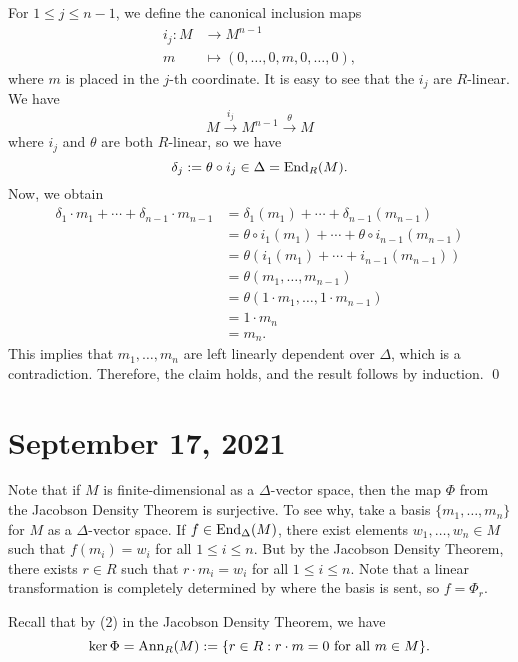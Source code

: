\begin{enumerate}[(1)]
    For $1 \leq j \leq n-1$, we define the canonical inclusion maps 
    \begin{align*}
        i_j : M &\to M^{n-1} \\
        m &\mapsto (0, \dots, 0, m, 0, \dots, 0),
    \end{align*}
    where $m$ is placed in the $j$-th coordinate. It is easy to see that the $i_j$ are $R$-linear. 
    We have 
    \[ M \xrightarrow{i_j} M^{n-1} \xrightarrow{\theta} M \]
    where $i_j$ and $\theta$ are both $R$-linear, so we have 
    \[ \delta_j := \theta \circ i_j \in \Delta = \operatorname{End}_R(M). \]
    Now, we obtain 
    \begin{align*}
        \delta_1 \cdot m_1 + \cdots + \delta_{n-1} \cdot m_{n-1} 
        &= \delta_1(m_1) + \cdots + \delta_{n-1}(m_{n-1}) \\
        &= \theta \circ i_1(m_1) + \cdots + \theta \circ i_{n-1}(m_{n-1}) \\
        &= \theta(i_1(m_1) + \cdots + i_{n-1}(m_{n-1})) \\
        &= \theta(m_1, \dots, m_{n-1}) \\
        &= \theta(1 \cdot m_1, \dots, 1 \cdot m_{n-1}) \\
        &= 1 \cdot m_n \\
        &= m_n.
    \end{align*}
    This implies that $m_1, \dots, m_n$ are left linearly dependent over $\Delta$, which is a contradiction.
    Therefore, the claim holds, 
    and the result follows by induction. \qed
    
\end{enumerate}

\section{September 17, 2021}

Note that if $M$ is finite-dimensional as a $\Delta$-vector space, then the map $\Phi$ from the 
Jacobson Density Theorem is surjective. To see why, take a basis $\{m_1, \dots, m_n\}$ for $M$ as a 
$\Delta$-vector space. If $f \in \operatorname{End}_\Delta(M)$, there exist elements $w_1, \dots, w_n \in M$ 
such that $f(m_i) = w_i$ for all $1 \leq i \leq n$. But by the Jacobson Density Theorem, there
exists $r \in R$ such that $r \cdot m_i = w_i$ for all $1 \leq i \leq n$. 
Note that a linear transformation is completely 
determined by where the basis is sent, so $f = \Phi_r$. 

Recall that by (2) in the Jacobson Density Theorem, we have 
\[ \ker \Phi = \operatorname{Ann}_R(M) := \{r \in R : r \cdot m = 0 \text{ for all } m \in M\}. \]

